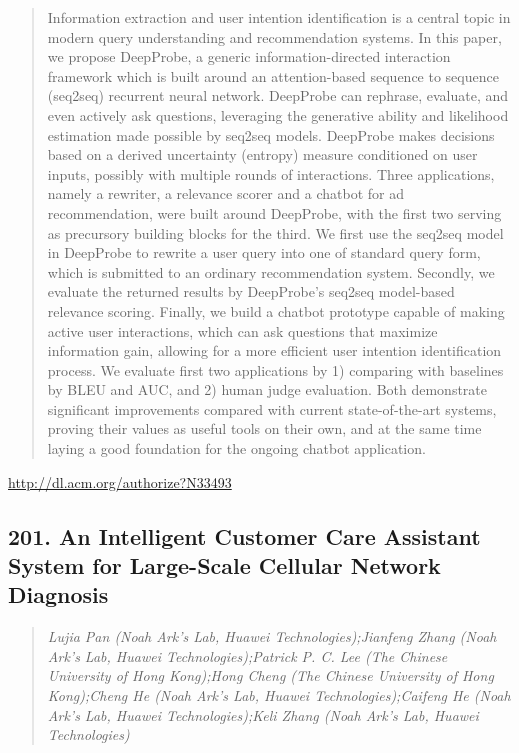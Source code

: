 \documentclass{article}
\begin{document}
\begin{quote}
Information extraction and user intention identification is a central topic in modern query understanding and recommendation systems. In this paper, we propose DeepProbe, a generic information-directed interaction framework which is built around an attention-based sequence to sequence (seq2seq) recurrent neural network. DeepProbe can rephrase, evaluate, and even actively ask questions, leveraging the generative ability and likelihood estimation made possible by seq2seq models. DeepProbe makes decisions based on a derived uncertainty (entropy) measure conditioned on user inputs, possibly with multiple rounds of interactions. Three applications, namely a rewriter, a relevance scorer and a chatbot for ad recommendation, were built around DeepProbe, with the first two serving as precursory building blocks for the third. We first use the seq2seq model in DeepProbe to rewrite a user query into one of standard query form, which is submitted to an ordinary recommendation system. Secondly, we evaluate the returned results by DeepProbe’s seq2seq model-based relevance scoring. Finally, we build a chatbot prototype capable of making active user interactions, which can ask questions that maximize information gain, allowing for a more efficient user intention identification process. We evaluate first two applications by 1) comparing with baselines by BLEU and AUC, and 2) human judge evaluation. Both demonstrate significant improvements compared with current state-of-the-art systems, proving their values as useful tools on their own, and at the same time laying a good foundation for the ongoing chatbot application.
\end{quote}

\href{http://dl.acm.org/authorize?N33493}{http://dl.acm.org/authorize?N33493}

\subsection{201. An Intelligent Customer Care Assistant System for Large-Scale Cellular Network Diagnosis}

\begin{quote}
\footnotesize{\textit{Lujia Pan (Noah Ark's Lab, Huawei Technologies);Jianfeng Zhang (Noah Ark's Lab, Huawei Technologies);Patrick P. C. Lee (The Chinese University of Hong Kong);Hong Cheng (The Chinese University of Hong Kong);Cheng He (Noah Ark's Lab, Huawei Technologies);Caifeng He (Noah Ark's Lab, Huawei Technologies);Keli Zhang (Noah Ark's Lab, Huawei Technologies)}}

\end{quote}
\end{document}
